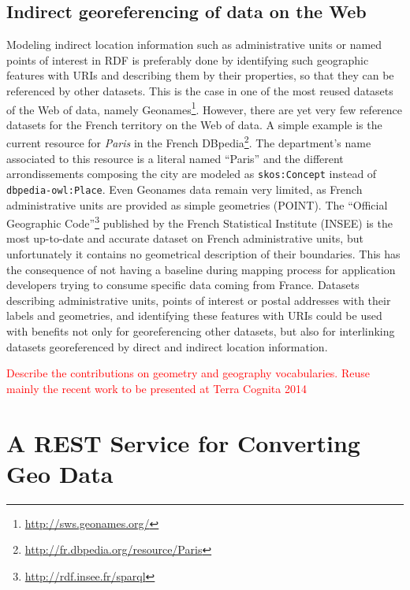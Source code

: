 \subsection{Indirect georeferencing of data on the Web}
\label{sec:indirectgeo}
Modeling indirect location information such as administrative units or named points of interest in RDF is preferably done by identifying such geographic features with URIs and describing them by their properties, so that they can be referenced by other datasets. This is the case in one of the most reused datasets of the Web of data, namely Geonames\footnote{\url{http://sws.geonames.org/}}. However, there are yet very few reference datasets for the French territory on the Web of data.  A simple example is the current resource for \textit{Paris} in the French DBpedia\footnote{\url{http://fr.dbpedia.org/resource/Paris}}. The department's name associated to this resource is a literal named ``Paris'' and the different arrondissements composing the city are modeled as \texttt{skos:Concept} instead of \texttt{dbpedia-owl:Place}. Even Geonames data remain very limited, as French administrative units are provided as simple geometries (POINT). The ``Official Geographic Code''\footnote{\url{http://rdf.insee.fr/sparql}} published by the French Statistical Institute (INSEE) is the most up-to-date and accurate dataset on French administrative units, but unfortunately it contains no geometrical description of their boundaries. This has the consequence of not having a baseline during mapping process for application developers trying to consume specific data coming from France. Datasets describing administrative units, points of interest or postal addresses with their labels and geometries, and identifying these features with URIs could be used with benefits not only for georeferencing other datasets, but also for interlinking datasets georeferenced by direct and indirect location information.


\textcolor{red}{Describe the contributions on geometry and geography vocabularies. Reuse mainly the recent work to be presented at Terra Cognita 2014}


\section{A REST Service for Converting Geo Data}
\label{sec:rest-service}

